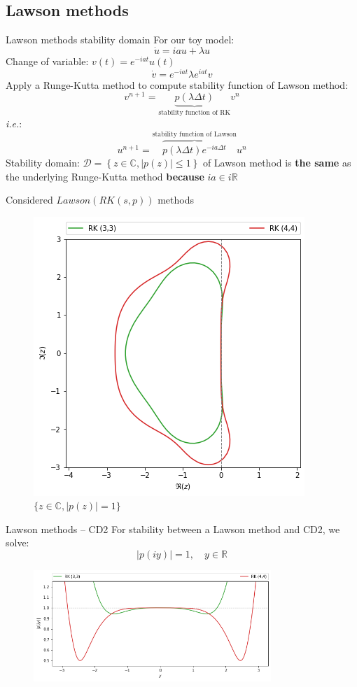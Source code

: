 \documentclass{beamer}
\begin{document}
\subsection{Lawson methods}
\begin{frame}{Lawson methods stability domain}
  For our toy model:
  $$
    \dot{u} = iau + \lambda u
  $$
  Change of variable: $v(t) = e^{-iat}u(t)$
  $$
    \dot{v} = e^{-iat}\lambda e^{iat}v
  $$
  Apply a Runge-Kutta method to compute stability function of Lawson method:
  $$
    v^{n+1} = \underbrace{p(\lambda\Delta t)}_{\text{stability function of RK}}v^n
  $$
  \emph{i.e.}:
  $$
    u^{n+1} = \overbrace{p(\lambda\Delta t)e^{-ia\Delta t}}^{\text{stability function of Lawson}}u^n
  $$
  Stability domain: $\mathcal{D}=\left\{z\in\mathbb{C},|p(z)|\leq 1\right\}$ of Lawson method is \textbf{the same} as the underlying Runge-Kutta method \textbf{because} $ia\in i\mathbb{R}$
\end{frame}
\begin{frame}{Considered $Lawson(RK(s,p))$ methods}
  \begin{figure}\centering
    \includegraphics[height=0.75\textheight]{img/rk_sd.png}
    \caption{$\{z\in\mathbb{C},|p(z)|=1\}$}
  \end{figure}
\end{frame}
\begin{frame}{Lawson methods -- CD2}
  For stability between a Lawson method and CD2, we solve:
  $$
    |p(iy)| = 1,\quad y\in\mathbb{R}
  $$
  \begin{figure}\centering
    \includegraphics[width=0.8\textwidth]{img/yaxis.png}
  \end{figure}
\end{frame}
\end{document}

